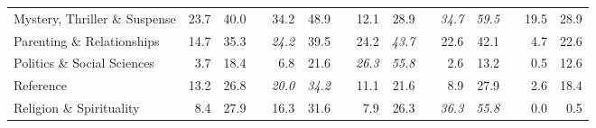 \documentclass[12pt]{article}
\numberwithin{equation}{section}
\numberwithin{figure}{section}
\begin{document}
\begin{table}[]
{\begin{tabular}{lrrrrrrrrrrrrrr}
	Mystery, Thriller \& Suspense  & 23.7                               & 40.0                               &                               & 34.2                               & 48.9                               &                               & 12.1                               & 28.9                               &                               & \textit{34.7}                      & \textit{59.5}                      &                               & 19.5                               & 28.9                               \\
	Parenting \& Relationships     & 14.7                               & 35.3                               &                               & \textit{24.2}                      & 39.5                               &                               & 24.2                               & \textit{43.7}                      &                               & 22.6                               & 42.1                               &                               & 4.7                                & 22.6                               \\
	Politics \& Social Sciences    & 3.7                                & 18.4                               &                               & 6.8                                & 21.6                               &                               & \textit{26.3}                      & \textit{55.8}                      &                               & 2.6                                & 13.2                               &                               & 0.5                                & 12.6                               \\
	Reference                      & 13.2                               & 26.8                               &                               & \textit{20.0}                      & \textit{34.2}                      &                               & 11.1                               & 21.6                               &                               & 8.9                                & 27.9                               &                               & 2.6                                & 18.4                               \\
	Religion \& Spirituality       & 8.4                                & 27.9                               &                               & 16.3                               & 31.6                               &                               & 7.9                                & 26.3                               &                               & \textit{36.3}                      & \textit{55.8}                      &                               & 0.0                                & 0.5                                \\

\end{tabular}}
\end{table}
\end{document}

